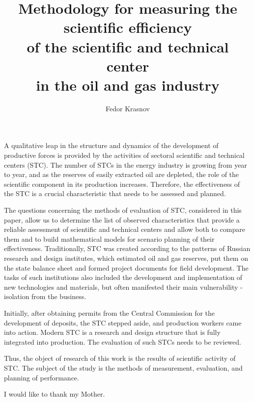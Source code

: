 \documentclass[12pt]{report}
\theoremstyle{definition}
\begin{document}
\title{Methodology for measuring the scientific efficiency\\
	   of the scientific and technical center \\
	   in the oil and gas industry}
\author{Fedor Krasnov}
 
\beforepreface
{}

A qualitative leap in the structure and dynamics of the development of productive forces is provided by the activities of sectoral scientific and technical centers (STC). 
The number of STCs in the energy industry is growing from year to year, and as the reserves of easily extracted oil are depleted, the role of the scientific component in its production increases. Therefore, the effectiveness of the STC is a crucial characteristic that needs to be assessed and planned. 

The questions concerning the methods of evaluation of STC, considered in this paper, allow us to determine the list of observed characteristics that provide a reliable assessment of scientific and technical centers and allow both to compare them and to build mathematical models for scenario planning of their effectiveness. Traditionally, STC was created according to the patterns of Russian research and design institutes, which estimated oil and gas reserves, put them on the state balance sheet and formed project documents for field development. The tasks of such institutions also included the development and implementation of new technologies and materials, but often manifested their main vulnerability - isolation from the business.

Initially, after obtaining permits from the Central Commission for the development of deposits, the STC stepped aside, and production workers came into action. Modern STC is a research and design structure that is fully integrated into production. The evaluation of such STCs needs to be reviewed. 

Thus, the object of research of this work is the results of scientific activity of STC. The subject of the study is the methods of measurement, evaluation, and planning of performance.

I would like to thank my Mother.
\afterpreface
\end{document}
